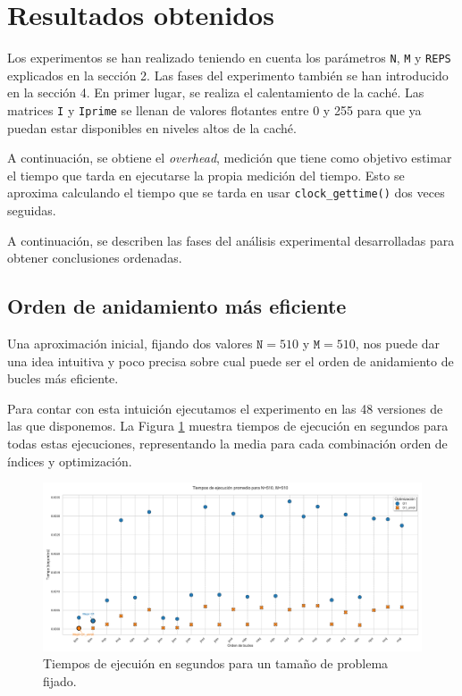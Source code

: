 \documentclass[11pt,a4paper,twoside]{article}
\theoremstyle{definition}
\begin{document}
	
	\section{Resultados obtenidos}
	
	Los experimentos se han realizado teniendo en cuenta los parámetros \texttt{N}, \texttt{M} y \texttt{REPS} explicados en la sección 2. Las fases del experimento también se han introducido en la sección 4. En primer lugar, se realiza el calentamiento de la caché. Las matrices \texttt{I} y \texttt{Iprime} se llenan de valores flotantes entre 0 y 255 para que ya puedan estar disponibles en niveles altos de la caché. 
	
	A continuación, se obtiene el \textit{overhead}, medición que tiene como objetivo estimar el tiempo que tarda en ejecutarse la propia medición del tiempo. Esto se aproxima calculando el tiempo que se tarda en usar \texttt{clock\_gettime()} dos veces seguidas.
	
	A continuación, se describen las fases del análisis experimental desarrolladas para obtener conclusiones ordenadas.
	
	\subsection{Orden de anidamiento más eficiente}
	
	Una aproximación inicial, fijando dos valores $\texttt{N}=510$ y $\texttt{M}=510$, nos puede dar una idea intuitiva y poco precisa sobre cual puede ser el orden de anidamiento de bucles más eficiente.
	
	Para contar con esta intuición ejecutamos el experimento en las 48 versiones de las que disponemos. La Figura \ref{graf1} muestra tiempos de ejecución en segundos para todas estas ejecuciones, representando la media para cada combinación orden de índices y optimización.
	
	\begin{figure} [H] \centering
		\includegraphics[width=\textwidth]{../graficas/tiempos_N510_M510.pdf}
		\caption{Tiempos de ejecuión en segundos para un tamaño de problema fijado.}
		\label{graf1}
	\end{figure}
\end{document}
